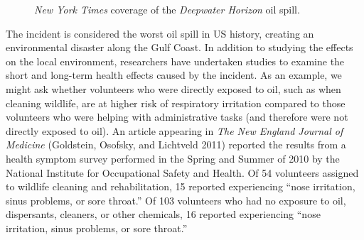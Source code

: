 \documentclass[
  letterpaper,
  DIV=11,
  numbers=noendperiod]{scrreprt}
\theoremstyle{plain}
\theoremstyle{definition}
\theoremstyle{definition}
\theoremstyle{remark}
\begin{document}
\begin{figure}


\caption{\label{fig-casedeepwater-nytclip}\emph{New York Times} coverage
of the \emph{Deepwater Horizon} oil spill.}

\end{figure}%

The incident is considered the worst oil spill in US history, creating
an environmental disaster along the Gulf Coast. In addition to studying
the effects on the local environment, researchers have undertaken
studies to examine the short and long-term health effects caused by the
incident. As an example, we might ask whether volunteers who were
directly exposed to oil, such as when cleaning wildlife, are at higher
risk of respiratory irritation compared to those volunteers who were
helping with administrative tasks (and therefore were not directly
exposed to oil). An article appearing in \emph{The New England Journal
of Medicine} (Goldstein, Osofsky, and Lichtveld 2011) reported the
results from a health symptom survey performed in the Spring and Summer
of 2010 by the National Institute for Occupational Safety and Health. Of
54 volunteers assigned to wildlife cleaning and rehabilitation, 15
reported experiencing ``nose irritation, sinus problems, or sore
throat.'' Of 103 volunteers who had no exposure to oil, dispersants,
cleaners, or other chemicals, 16 reported experiencing ``nose
irritation, sinus problems, or sore throat.''
\end{document}
